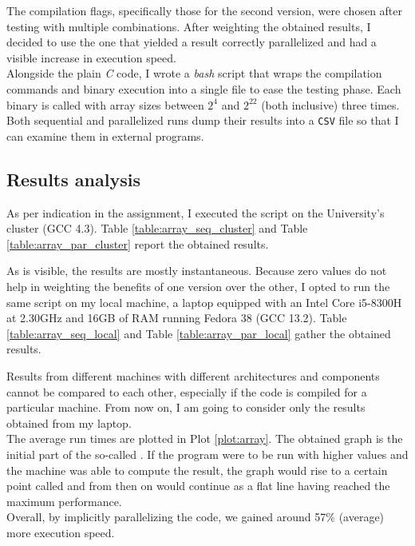 The compilation flags, specifically those for the second version, were chosen after testing with multiple combinations. %
After weighting the obtained results, I decided to use the one that yielded a result correctly parallelized and had a visible %
increase in execution speed.\\
Alongside the plain \textit{C} code, I wrote a \textit{bash} script that wraps the compilation commands and binary execution %
into a single file to ease the testing phase. Each binary is called with array sizes between $2^4$ and $2^{22}$ (both inclusive) %
three times. Both sequential and parallelized runs dump their results into a \texttt{CSV} file so that I can examine %
them in external programs.%

\subsection*{Results analysis}
As per indication in the assignment, I executed the script on the University's cluster (GCC 4.3). Table %
\ref{table:array_seq_cluster} and Table \ref{table:array_par_cluster} report the obtained results.%

\begin{table}[h!tb]
    \centering
    \parbox{.45\linewidth}{
    }
    \parbox{.50\linewidth}{
    }
\end{table}

As is visible, the results are mostly instantaneous. Because zero values do not help in weighting the benefits of %
one version over the other, I opted to run the same script on my local machine, a laptop equipped with an Intel%
\textsuperscript{\textregistered} Core\textsuperscript{\texttrademark} i5-8300H at 2.30GHz and 16GB of RAM running Fedora %
38 (GCC 13.2). Table \ref{table:array_seq_local} and Table \ref{table:array_par_local} gather the obtained results.

\begin{table}[h!tb]
    \centering
    \parbox{.45\linewidth}{
    }
    \parbox{.50\linewidth}{
    }
\end{table}

Results from different machines with different architectures and components cannot be compared to each other, especially %
if the code is compiled for a particular machine. From now on, I am going to consider only the results obtained from my laptop.\\%
The average run times are plotted in Plot \ref{plot:array}. The obtained graph is the initial part of the so-called %
. If the program were to be run with higher values and the machine was able to compute the result, 
the graph would rise to a certain point called  and from then on would continue as a flat line having reached %
the maximum performance.\\%
Overall, by implicitly parallelizing the code, we gained around 57\% (average) more execution speed.%

